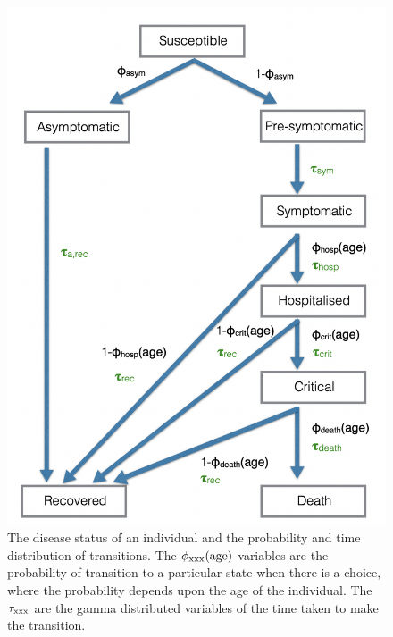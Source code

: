 \documentclass[11pt, oneside]{amsart}   	%
\begin{document}
\begin{figure}
\centering
\includegraphics[width=.9\textwidth]{diseaseDynamics.png}
\caption{The disease status of an individual and the probability and time distribution of transitions. The $\phi_{\rm xxx}(\rm age)$ variables are the probability of transition to a particular state when there is a choice, where the probability depends upon the age of the individual.  The $\tau_{\rm xxx}$ are the gamma distributed variables of the time taken to make the transition.}
\label{diseaseDynamics}
\end{figure}
\end{document}
